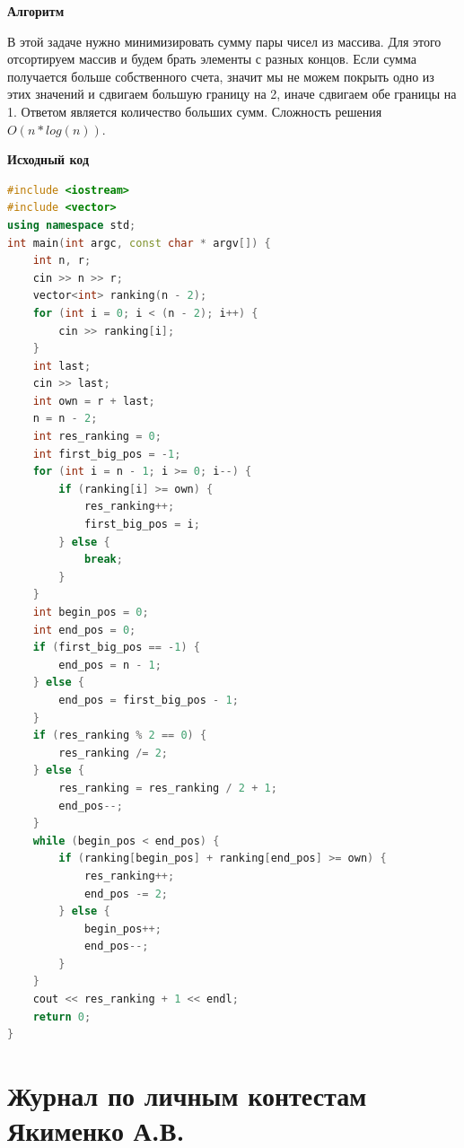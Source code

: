 \documentclass[a4paper,12pt]{article}
\begin{document}
\textbf{{\large Алгоритм}}

В этой задаче нужно минимизировать сумму пары чисел из массива. Для этого отсортируем массив и будем брать элементы с разных концов. Если сумма получается больше собственного счета, значит мы не можем покрыть одно из этих значений и сдвигаем большую границу на 2, иначе сдвигаем обе границы на 1. Ответом является количество больших сумм. Сложность решения $O(n * log(n))$.\\

\newpage

\textbf{{\large Исходный код}} \\
\begin{lstlisting}[language=C++]
#include <iostream>
#include <vector>
using namespace std;
int main(int argc, const char * argv[]) {
    int n, r;
    cin >> n >> r;
    vector<int> ranking(n - 2);
    for (int i = 0; i < (n - 2); i++) {
        cin >> ranking[i];
    }
    int last;
    cin >> last;
    int own = r + last;
    n = n - 2;
    int res_ranking = 0;
    int first_big_pos = -1;
    for (int i = n - 1; i >= 0; i--) {
        if (ranking[i] >= own) {
            res_ranking++;
            first_big_pos = i;
        } else {
            break;
        }
    }
    int begin_pos = 0;
    int end_pos = 0;
    if (first_big_pos == -1) {
        end_pos = n - 1;
    } else {
        end_pos = first_big_pos - 1;
    }
    if (res_ranking % 2 == 0) {
        res_ranking /= 2;
    } else {
        res_ranking = res_ranking / 2 + 1;
        end_pos--;
    }
    while (begin_pos < end_pos) {
        if (ranking[begin_pos] + ranking[end_pos] >= own) {
            res_ranking++;
            end_pos -= 2;
        } else {
            begin_pos++;
            end_pos--;
        }
    }
    cout << res_ranking + 1 << endl;
    return 0;
}
\end{lstlisting}














\newpage
\section{Журнал по личным контестам Якименко А.В.}

%
%
\end{document}

